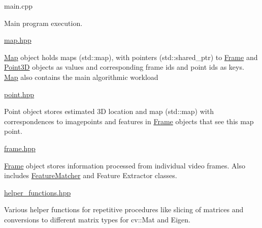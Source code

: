 main.\+cpp
\begin{DoxyItemize}
\item Main program execution.
\end{DoxyItemize}

\mbox{\hyperlink{map_8hpp_source}{map.\+hpp}}
\begin{DoxyItemize}
\item \mbox{\hyperlink{classMap}{Map}} object holds maps (std\+::map), with pointers (std\+::shared\+\_\+ptr) to \mbox{\hyperlink{classFrame}{Frame}} and \mbox{\hyperlink{classPoint3D}{Point3D}} objects as values and corresponding frame ids and point ids as keys. \mbox{\hyperlink{classMap}{Map}} also contains the main algorithmic workload
\end{DoxyItemize}

\mbox{\hyperlink{point_8hpp_source}{point.\+hpp}}
\begin{DoxyItemize}
\item Point object stores estimated 3D location and map (std\+::map) with correspondences to imagepoints and features in \mbox{\hyperlink{classFrame}{Frame}} objects that see this map point.
\end{DoxyItemize}

\mbox{\hyperlink{frame_8hpp_source}{frame.\+hpp}}
\begin{DoxyItemize}
\item \mbox{\hyperlink{classFrame}{Frame}} object stores information processed from individual video frames. Also includes \mbox{\hyperlink{classFeatureMatcher}{Feature\+Matcher}} and Feature Extractor classes.
\end{DoxyItemize}

\mbox{\hyperlink{helper__functions_8hpp_source}{helper\+\_\+functions.\+hpp}}
\begin{DoxyItemize}
\item Various helper functions for repetitive procedures like slicing of matrices and conversions to different matrix types for cv\+::\+Mat and Eigen. 
\end{DoxyItemize}